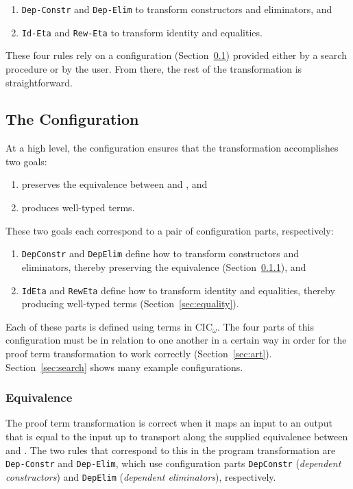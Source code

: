 \begin{enumerate}
\item \lstinline{Dep-Constr} and \lstinline{Dep-Elim} to transform constructors and eliminators, and
\item \lstinline{Id-Eta} and \lstinline{Rew-Eta} to transform identity and equalities.
\end{enumerate}
These four rules rely on a configuration (Section~\ref{sec:configurable}) %
provided either by a search procedure or by the user.
From there, the rest of the transformation is straightforward.

\subsection{The Configuration}
\label{sec:configurable}

At a high level, the configuration ensures that the transformation accomplishes two goals:

\begin{enumerate}
\item preserves the equivalence between \A and \B, and
\item produces well-typed terms.
\end{enumerate}
These two goals each correspond to a pair of configuration parts, respectively:

\begin{enumerate}
\item \lstinline{DepConstr} and \lstinline{DepElim} define how to transform constructors and eliminators, thereby preserving the equivalence (Section~\ref{sec:equivalence}), and 
\item \lstinline{IdEta} and \lstinline{RewEta} define how to transform identity and equalities, thereby producing well-typed terms (Section~\ref{sec:equality}).
\end{enumerate}

Each of these parts is defined using terms in CIC$_{\omega}$.
The four parts of this configuration must be in relation to one another in a certain way in order for the proof
term transformation to work correctly (Section~\ref{sec:art}).
Section~\ref{sec:search} shows many example configurations.

\subsubsection{Equivalence}
\label{sec:equivalence}

The proof term transformation is correct when it maps an input to an output that is equal
to the input up to transport along the supplied equivalence between \A and \B.
The two rules that correspond to this in the program transformation are \lstinline{Dep-Constr} and \lstinline{Dep-Elim},
which use configuration parts \lstinline{DepConstr} (\textit{dependent constructors}) and \lstinline{DepElim} (\textit{dependent eliminators}), respectively.

